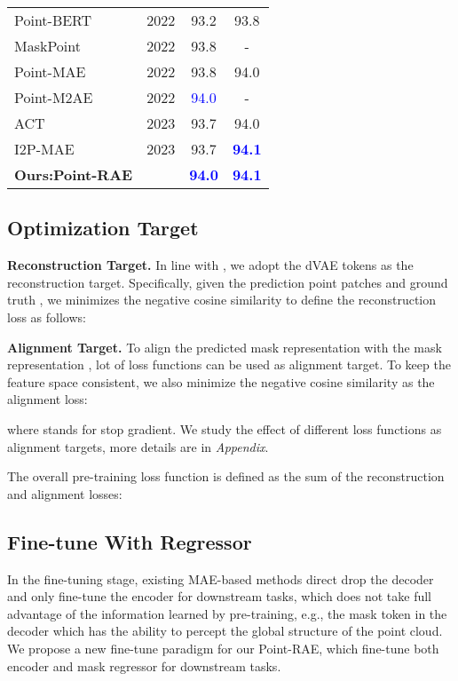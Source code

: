 \documentclass[sigconf, screen]{acmart}
\begin{document}
\begin{table}
\begin{tabular}{@{}lccc}
Point-BERT \cite{yu2022point} &2022&93.2  &93.8  \\
MaskPoint \cite{liu2022masked}&2022 &93.8 & - \\
Point-MAE \cite{pang2022masked}&2022 &93.8 &94.0\\
Point-M2AE \cite{zhang2022masked} &2022&\textcolor{blue}{94.0} &-\\
ACT \cite{dong2022autoencoders}&2023 &93.7 &94.0  \\
I2P-MAE \cite{zhang2022learning}&2023 &93.7 &\textcolor{blue}{\bf94.1}  \\
\textbf{Ours:Point-RAE}  &&\textcolor{blue}{\bf 94.0} &\textcolor{blue}{\bf 94.1} \\


\bottomrule[1pt]

\end{tabular}
\label{modelnet}
\end{table}

\subsection{Optimization Target}
\noindent \textbf{Reconstruction Target.}
In line with \cite{dong2022autoencoders}, we adopt the dVAE tokens as the reconstruction target. Specifically, given the prediction point patches  and ground truth , we minimizes the negative cosine similarity  to define the reconstruction loss as follows:


\noindent \textbf{Alignment Target.}
To align the predicted mask representation  with the mask representation , lot of loss functions can be used as alignment target.
To keep the feature space consistent, we also minimize the negative cosine similarity as the alignment loss:

where  stands for stop gradient.
We study the effect of different loss functions as alignment targets, more details are in \textit{Appendix}.

The overall pre-training loss function is defined as the sum of the reconstruction and alignment losses:





\subsection{Fine-tune With Regressor}
In the fine-tuning stage, existing MAE-based methods direct drop the decoder and only fine-tune the encoder for downstream tasks, which does not take full advantage of the information learned by pre-training, e.g., the mask token in the decoder which has the ability to percept the global structure of the point cloud.
We propose a new fine-tune paradigm for our Point-RAE, which fine-tune both encoder and mask regressor for downstream tasks.
\end{document}
